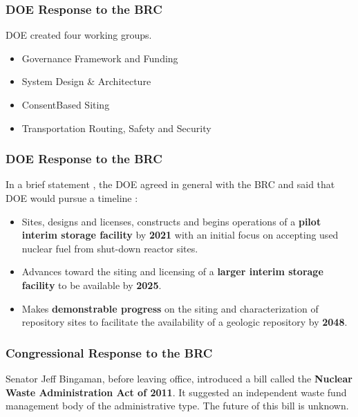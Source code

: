 \begin{frame}
    \frametitle{DOE Response to the BRC}

    DOE created four working groups. 
    \begin{itemize}
      \item Governance Framework and Funding
      \item System Design \& Architecture
      \item ConsentBased Siting
      \item Transportation Routing, Safety and Security
    \end{itemize}
  \end{frame}

\begin{frame}
    \frametitle{DOE Response to the BRC}
    \footnotesize{
    In a brief statement \cite{doe_strategy_2013}, the DOE agreed in general 
    with the BRC and said that DOE would pursue a timeline :

    \begin{itemize}
      \item Sites, designs and licenses, constructs and begins operations of a 
        \textbf{pilot interim storage facility} by \textbf{2021} with an initial 
        focus on accepting used nuclear fuel from shut-down reactor sites.
      \item Advances toward the siting and licensing of a \textbf{larger interim 
        storage facility} to be available by \textbf{2025}.
      \item Makes \textbf{demonstrable progress} on the siting and characterization of 
        repository sites to facilitate the availability of a geologic repository 
        by \textbf{2048}.
    \end{itemize}
  }
  \end{frame}

\begin{frame}
    \frametitle{Congressional Response to the BRC}
    Senator Jeff Bingaman, before leaving office, introduced a bill called the 
    \textbf{Nuclear Waste Administration Act of 2011}. It suggested an independent waste fund management body of the administrative type.  The future of this bill is unknown.  
  \end{frame}

